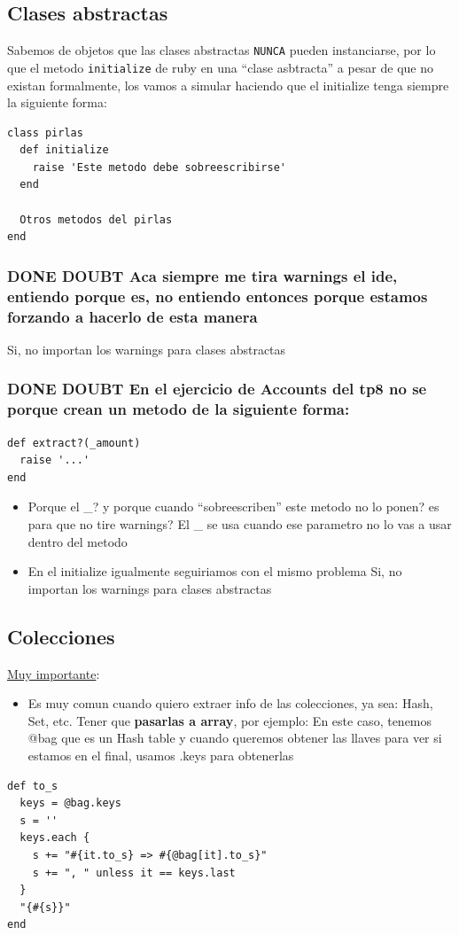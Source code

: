 \documentclass[11pt]{article}
\begin{document}
\subsection{Clases abstractas}
\label{sec:org72e9d32}
Sabemos de objetos que las clases abstractas \texttt{NUNCA} pueden instanciarse, por lo que el metodo \texttt{initialize} de ruby en una ``clase asbtracta'' a pesar de que no existan formalmente, los vamos a simular haciendo que el initialize tenga siempre la siguiente forma:

\begin{verbatim}
class pirlas
  def initialize
    raise 'Este metodo debe sobreescribirse'
  end

  Otros metodos del pirlas
end
\end{verbatim}
\subsubsection{{\bfseries\sffamily DONE} DOUBT Aca siempre me tira warnings el ide, entiendo porque es, no entiendo entonces porque estamos forzando a hacerlo de esta manera}
\label{sec:org4a7a5e7}
Si, no importan los warnings para clases abstractas
\subsubsection{{\bfseries\sffamily DONE} DOUBT En el ejercicio de Accounts del tp8 no se porque crean un metodo de la siguiente forma:}
\label{sec:org742a6ee}
\begin{verbatim}
def extract?(_amount)
  raise '...'
end
\end{verbatim}
\begin{itemize}
  \item[{$\boxtimes$}] Porque el \_? y porque cuando ``sobreescriben'' este metodo no lo ponen? es para que no tire warnings?
    El \_ se usa cuando ese parametro no lo vas a usar dentro del metodo
  \item[{$\boxtimes$}] En el initialize igualmente seguiriamos con el mismo problema
    Si, no importan los warnings para clases abstractas
\end{itemize}
\subsection{Colecciones}
\label{sec:org7ab8b88}
\uline{Muy importante}:
\begin{itemize}
  \item Es muy comun cuando quiero extraer info de las colecciones, ya sea: Hash, Set, etc. Tener que \textbf{pasarlas a array}, por ejemplo:
    En este caso, tenemos @bag que es un Hash table y cuando queremos obtener las llaves para ver si estamos en el final, usamos .keys para obtenerlas
\end{itemize}
\begin{verbatim}
def to_s
  keys = @bag.keys
  s = ''
  keys.each {
    s += "#{it.to_s} => #{@bag[it].to_s}"
    s += ", " unless it == keys.last
  }
  "{#{s}}"
end
\end{verbatim}
\end{document}
